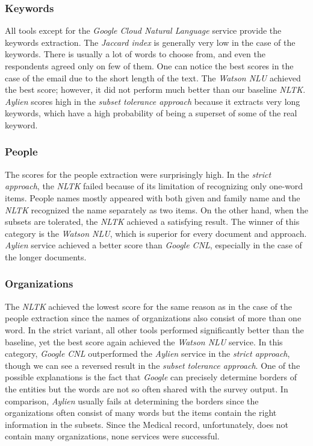 \documentclass[
  digital, %
  notable,   %
  nolof,     %
  nolot,     %
]{fithesis3}
\begin{document}
\subsubsection{\textbf{Keywords}}
All tools except for the \textit{Google Cloud Natural Language} service provide the keywords extraction.
The \textit{Jaccard index} is generally very low in the case of the keywords.
There is usually a lot of words to choose from, and even the respondents agreed only on few of them.
One can notice the best scores in the case of the email due to the short length of the text.
The \textit{Watson NLU} achieved the best score; however, it did not perform much better than our baseline \textit{NLTK}.
\textit{Aylien} scores high in the \textit{subset tolerance approach} because it extracts very long keywords, which have a high probability of being a superset of some of the real keyword.

\subsubsection{\textbf{People}}
The scores for the people extraction were surprisingly high.
In the \textit{strict approach}, the \textit{NLTK} failed because of its limitation of recognizing only one-word items.
People names mostly appeared with both given and family name and the \textit{NLTK} recognized the name separately as two items.
On the other hand, when the subsets are tolerated, the \textit{NLTK} achieved a satisfying result.
The winner of this category is the \textit{Watson NLU}, which is superior for every document and approach.
\textit{Aylien} service achieved a better score than \textit{Google CNL}, especially in the case of the longer documents.

\subsubsection{\textbf{Organizations}}
The \textit{NLTK} achieved the lowest score for the same reason as in the case of the people extraction since the names of organizations also consist of more than one word.
In the strict variant, all other tools performed significantly better than the baseline, yet the best score again achieved the \textit{Watson NLU} service.
In this category, \textit{Google CNL} outperformed the \textit{Aylien} service in the \textit{strict approach}, though we can see a reversed result in the \textit{subset tolerance approach}.
One of the possible explanations is the fact that \textit{Google} can precisely determine borders of the entities but the words are not so often shared with the survey output.
In comparison, \textit{Aylien} usually fails at determining the borders since the organizations often consist of many words but the items contain the right information in the subsets.
Since the Medical record, unfortunately, does not contain many organizations, none services were successful.
\end{document}
